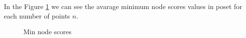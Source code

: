 \documentclass{article}
\begin{document}
\par In the Figure \ref{fig:scores_node_min} we can see the avarage minimum node scores values in poset for each number of points $n$.
\begin{figure}[ht]
  \vspace{-116pt}
  \centering
  \hspace*{-0.48\textwidth}
  \caption{Min node scores}
  \label{fig:scores_node_min}
\end{figure}
\end{document}

